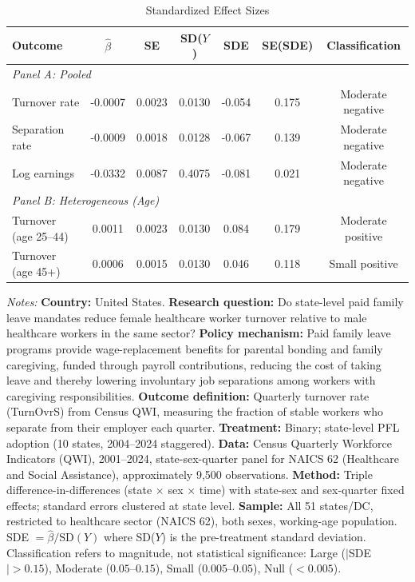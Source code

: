 \begin{table}[htbp]
\begin{threeparttable}
\centering
\caption{Standardized Effect Sizes}
\label{tab:sde}
\begin{tabular}{lcccccc}
\toprule
Outcome & $\hat{\beta}$ & SE & SD($Y$) & SDE & SE(SDE) & Classification \\
\midrule
\multicolumn{7}{l}{\textit{Panel A: Pooled}} \\
\midrule
Turnover rate & -0.0007 & 0.0023 & 0.0130 & -0.054 & 0.175 & Moderate negative \\
Separation rate & -0.0009 & 0.0018 & 0.0128 & -0.067 & 0.139 & Moderate negative \\
Log earnings & -0.0332 & 0.0087 & 0.4075 & -0.081 & 0.021 & Moderate negative \\
\midrule
\multicolumn{7}{l}{\textit{Panel B: Heterogeneous (Age)}} \\
\midrule
Turnover (age 25--44) & 0.0011 & 0.0023 & 0.0130 & 0.084 & 0.179 & Moderate positive \\
Turnover (age 45+) & 0.0006 & 0.0015 & 0.0130 & 0.046 & 0.118 & Small positive \\
\bottomrule
\end{tabular}
\begin{tablenotes}
\item \textit{Notes:} \textbf{Country:} United States. \textbf{Research question:} Do state-level paid family leave mandates reduce female healthcare worker turnover relative to male healthcare workers in the same sector? \textbf{Policy mechanism:} Paid family leave programs provide wage-replacement benefits for parental bonding and family caregiving, funded through payroll contributions, reducing the cost of taking leave and thereby lowering involuntary job separations among workers with caregiving responsibilities. \textbf{Outcome definition:} Quarterly turnover rate (TurnOvrS) from Census QWI, measuring the fraction of stable workers who separate from their employer each quarter. \textbf{Treatment:} Binary; state-level PFL adoption (10 states, 2004--2024 staggered). \textbf{Data:} Census Quarterly Workforce Indicators (QWI), 2001--2024, state-sex-quarter panel for NAICS 62 (Healthcare and Social Assistance), approximately 9,500 observations. \textbf{Method:} Triple difference-in-differences (state $\times$ sex $\times$ time) with state-sex and sex-quarter fixed effects; standard errors clustered at state level. \textbf{Sample:} All 51 states/DC, restricted to healthcare sector (NAICS 62), both sexes, working-age population. SDE $= \hat{\beta} / \text{SD}(Y)$ where SD($Y$) is the pre-treatment standard deviation. Classification refers to magnitude, not statistical significance: Large ($|$SDE$| > 0.15$), Moderate ($0.05$--$0.15$), Small ($0.005$--$0.05$), Null ($< 0.005$).
\end{tablenotes}
\end{threeparttable}
\end{table}
